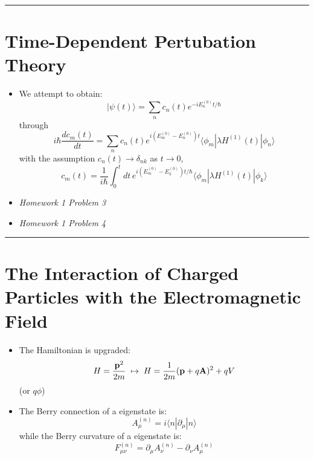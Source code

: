 
\usepackage{cancel}

\title{}
\author{Dane Jeon}
\abstract{}



\rule{\linewidth}{0.4pt}
\section*{Time-Dependent Pertubation Theory}

\begin{itemize}[leftmargin=*]
\item We attempt to obtain:
\[|\psi (t)\rangle =\sum _{n}c_{n}(t)e^{-iE^{(0)}_{n}t/\hbar }\]
through
\[i\hbar \dfrac{d c_{m}(t)}{d t}=\sum _{n}c_{n}(t)e^{i(E_{m}^{(0)}-E_{n}^{(0)})t}\langle \phi _{m}|\lambda H^{(1)}(t)|\phi _{n}\rangle  \]
with the assumption $c_{n}(t)\rightarrow \delta_{nk}$ as $t\rightarrow 0 $,
\[c_{m}(t)=\dfrac{1}{i\hbar }\int ^{t}_{0}dt\,e^{i(E_{m}^{(0)}-E_{k}^{(0)})t/\hbar }\langle \phi _{m}|\lambda H^{(1)}(t)|\phi _{k}\rangle \]
\item {\it Homework 1 Problem 3}
\item {\it Homework 1 Problem 4}
\vspace{2ex}

\end{itemize}

\rule{\linewidth}{0.4pt}

\section*{The Interaction of Charged Particles with the Electromagnetic Field}
\begin{itemize}[leftmargin=*]
\item The Hamiltonian is upgraded:
\[H=\dfrac{{\bf p}^2}{2m}\;\mapsto\; H=\dfrac{1}{2m}({\bf p}+q{\bf A})^2+qV\]
(or $q\phi $)
\item The Berry connection of a eigenstate is:
\[A^{(n)}_{\mu }=i\langle n|\partial _{\mu }|n\rangle \]
while the Berry curvature of a eigenstate is:
\[F_{\mu \nu }^{(n)}=\partial _{\mu } A_{\nu }^{(n)}-\partial _{\nu }A^{(n)}_{\mu }\]

\end{itemize}

